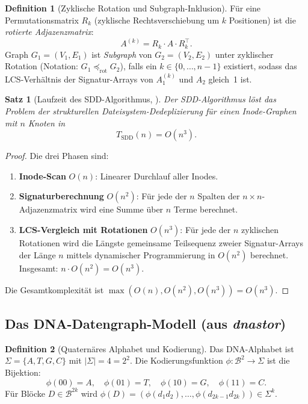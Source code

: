 ﻿\documentclass[a4paper,12pt]{article}
\theoremstyle{definition}
\newtheorem{definition}{Definition}[section]
\theoremstyle{plain}
\newtheorem{satz}{Satz}[section]
\begin{document}
\begin{definition}[Zyklische Rotation und Subgraph-Inklusion]
\label{def:rotation}
  Für eine Permutationsmatrix $R_k$ (zyklische Rechtsverschiebung um $k$
  Positionen) ist die \emph{rotierte Adjazenzmatrix}:
  \[
    A^{(k)} = R_k \cdot A \cdot R_k^\top.
  \]
  Graph $G_1 = (V_1, E_1)$ ist \emph{Subgraph} von $G_2 = (V_2, E_2)$
  unter zyklischer Rotation (Notation: $G_1 \preceq_{\mathrm{rot}} G_2$),
  falls ein $k \in \{0, \ldots, n-1\}$ existiert, sodass das
  LCS-Verhältnis der Signatur-Arrays von $A_1^{(k)}$ und $A_2$ gleich~1
  ist.
\end{definition}

\begin{satz}[Laufzeit des SDD-Algorithmus, \cite{dusgraph}]
\label{satz:sdd_laufzeit}
  Der SDD-Algorithmus löst das Problem der strukturellen Dateisystem-Dede\-pli\-zie\-rung
  für einen Inode-Graphen mit $n$ Knoten in
  \[
    T_{\mathrm{SDD}}(n) = O(n^3).
  \]
\end{satz}

\begin{proof}
  Die drei Phasen sind:
  \begin{enumerate}
    \item \textbf{Inode-Scan} $O(n)$: Linearer Durchlauf aller Inodes.
    \item \textbf{Signaturberechnung} $O(n^2)$: Für jede der $n$ Spalten
          der $n \times n$-Adjazenzmatrix wird eine Summe über $n$ Terme
          berechnet.
    \item \textbf{LCS-Vergleich mit Rotationen} $O(n^3)$: Für jede der $n$
          zyklischen Rotationen wird die Längste gemeinsame Teilsequenz zweier
          Signatur-Arrays der Länge $n$ mittels dynamischer Programmierung in
          $O(n^2)$ berechnet. Insgesamt: $n \cdot O(n^2) = O(n^3)$.
  \end{enumerate}
  Die Gesamtkomplexität ist $\max(O(n), O(n^2), O(n^3)) = O(n^3)$. 
\end{proof}

\subsection{Das DNA-Datengraph-Modell (aus \texorpdfstring{\textit{dnastor}}{dnastor})}
\label{ssec:dna_modell}

\begin{definition}[Quaternäres Alphabet und Kodierung]
\label{def:phi}
  Das DNA-Alphabet ist $\Sigma = \{A, T, G, C\}$ mit
  $|\Sigma| = 4 = 2^2$.  Die Kodierungsfunktion
  $\phi: \mathcal{B}^2 \to \Sigma$ ist die Bijektion:
  \[
    \phi(00) = A, \quad \phi(01) = T, \quad
    \phi(10) = G, \quad \phi(11) = C.
  \]
  Für Blöcke $D \in \mathcal{B}^{2k}$ wird
  $\phi(D) = (\phi(d_1 d_2), \ldots, \phi(d_{2k-1} d_{2k})) \in \Sigma^k$.
\end{definition}
\end{document}
